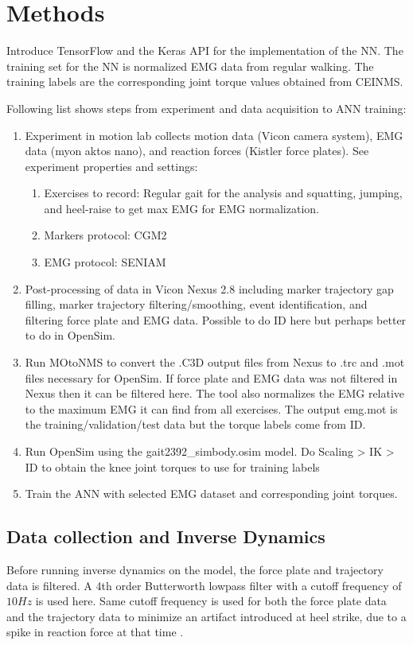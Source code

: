 \documentclass[../main.tex]{subfiles}
\begin{document}
\chapter{Methods}
Introduce TensorFlow and the Keras API for the implementation of the \ac{NN}.
The training set for the \ac{NN} is normalized EMG data from regular walking.
The training labels are the corresponding joint torque values obtained from CEINMS.

Following list shows steps from experiment and data acquisition to ANN training:
\begin{enumerate}
    \item Experiment in motion lab collects motion data (Vicon camera system), EMG data (myon aktos nano), and reaction forces (Kistler force plates). See experiment properties and settings:
    \begin{enumerate}
        \item Exercises to record: Regular gait for the analysis and squatting, jumping, and heel-raise to get max EMG for EMG normalization.
        \item Markers protocol: CGM2
        \item EMG protocol: SENIAM
    \end{enumerate}
    \item Post-processing of data in Vicon Nexus 2.8 including marker trajectory gap filling, marker trajectory filtering/smoothing, event identification, and filtering force plate and EMG data. Possible to do ID here but perhaps better to do in OpenSim.
    \item Run MOtoNMS to convert the .C3D output files from Nexus to .trc and .mot files necessary for OpenSim. If force plate and EMG data was not filtered in Nexus then it can be filtered here. The tool also normalizes the EMG relative to the maximum EMG it can find from all exercises. The output emg.mot is the training/validation/test data but the torque labels come from ID.
    \item Run OpenSim using the gait2392\_simbody.osim model. Do Scaling > IK > ID to obtain the knee joint torques to use for training labels
    \item Train the ANN with selected EMG dataset and corresponding joint torques.
\end{enumerate}



\section{Data collection and Inverse Dynamics}
Before running inverse dynamics on the model, the force plate and trajectory data is filtered. A 4th order Butterworth lowpass filter with a cutoff frequency of $10Hz$ is used here. Same cutoff frequency is used for both the force plate data and the trajectory data to minimize an artifact introduced at heel strike, due to a spike in reaction force at that time \cite{Kristianslund2012}.
\end{document}
